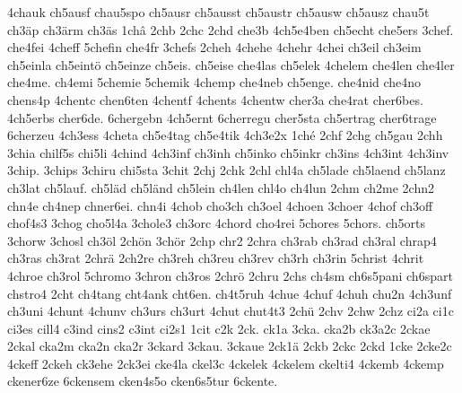 {    4chauk
    ch5ausf
    chau5spo
    ch5ausr
    ch5ausst
    ch5austr
    ch5ausw
    ch5ausz
    chau5t
    ch3äp
    ch3ärm
    ch3äs
    1châ
    2chb
    2chc
    2chd
    che3b
    4ch5e4ben
    ch5echt
    che5ers
    3chef.
    che4fei
    4cheff
    5chefin
    che4fr
    3chefs
    2cheh
    4chehe
    4chehr
    4chei
    ch3eil
    ch3eim
    ch5einla
    ch5eintö
    ch5einze
    ch5eis.
    ch5eise
    che4las
    ch5elek
    4chelem
    che4len
    che4ler
    che4me.
    ch4emi
    5chemie
    5chemik
    4chemp
    che4neb
    ch5enge.
    che4nid
    che4no
    chens4p
    4chentc
    chen6ten
    4chentf
    4chents
    4chentw
    cher3a
    che4rat
    cher6bes.
    4ch5erbs
    cher6de.
    6chergebn
    4ch5ernt
    6cherregu
    cher5sta
    ch5ertrag
    cher6trage
    6cherzeu
    4ch3ess
    4cheta
    ch5e4tag
    ch5e4tik
    4ch3e2x
    1ché
    2chf
    2chg
    ch5gau
    2chh
    3chia
    chilf5s
    chi5li
    4chind
    4ch3inf
    ch3inh
    ch5inko
    ch5inkr
    ch3ins
    4ch3int
    4ch3inv
    3chip.
    3chips
    3chiru
    chi5sta
    3chit
    2chj
    2chk
    2chl
    chl4a
    ch5lade
    ch5laend
    ch5lanz
    ch3lat
    ch5lauf.
    ch5läd
    ch5länd
    ch5lein
    ch4len
    chl4o
    ch4lun
    2chm
    ch2me
    2chn2
    chn4e
    ch4nep
    chner6ei.
    chn4i
    4chob
    cho3ch
    ch3oel
    4choen
    3choer
    4chof
    ch3off
    chof4s3
    3chog
    cho5l4a
    3chole3
    ch3orc
    4chord
    cho4rei
    5chores
    5chors.
    ch5orts
    3chorw
    3chosl
    ch3öl
    2chön
    3chör
    2chp
    chr2
    2chra
    ch3rab
    ch3rad
    ch3ral
    chrap4
    ch3ras
    ch3rat
    2chrä
    2ch2re
    ch3reh
    ch3reu
    ch3rev
    ch3rh
    ch3rin
    5christ
    4chrit
    4chroe
    ch3rol
    5chromo
    3chron
    ch3ros
    2chrö
    2chru
    2chs
    ch4sm
    ch6s5pani
    ch6spart
    chstro4
    2cht
    ch4tang
    cht4ank
    cht6en.
    ch4t5ruh
    4chue
    4chuf
    4chuh
    chu2n
    4ch3unf
    ch3uni
    4chunt
    4chunv
    ch3urs
    ch3urt
    4chut
    chut4t3
    2chü
    2chv
    2chw
    2chz
    ci2a
    ci1c
    ci3es
    cill4
    c3ind
    cins2
    c3int
    ci2s1
    1cit
    c2k
    2ck.
    ck1a
    3cka.
    cka2b
    ck3a2c
    2ckae
    2ckal
    cka2m
    cka2n
    cka2r
    3ckard
    3ckau.
    3ckaue
    2ck1ä
    2ckb
    2ckc
    2ckd
    1cke
    2cke2c
    4ckeff
    2ckeh
    ck3ehe
    2ck3ei
    cke4la
    ckel3c
    4ckelek
    4ckelem
    ckelti4
    4ckemb
    4ckemp
    ckener6ze
    6ckensem
    cken4s5o
    cken6s5tur
    6ckente.
}
